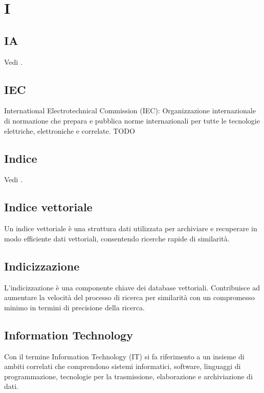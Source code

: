 \section{I}

\vspace{2em}
\subsection*{IA}
\par Vedi .

\vspace{2em}
\subsection*{IEC}
International Electrotechnical Commission (IEC): Organizzazione internazionale di normazione che prepara e pubblica norme internazionali per tutte le tecnologie elettriche, elettroniche e correlate.
TODO

\vspace{2em}
\subsection*{Indice}
\par Vedi .

\vspace{2em}
\subsection*{Indice vettoriale}
\par Un indice vettoriale è una struttura dati utilizzata per archiviare e recuperare in modo efficiente dati vettoriali, consentendo ricerche rapide di similarità.

\vspace{2em}
\subsection*{Indicizzazione}
L'indicizzazione è una componente chiave dei database vettoriali. Contribuisce ad aumentare la velocità del processo di ricerca per similarità con un compromesso minimo in termini di precisione della ricerca.

\vspace{2em}
\subsection*{Information Technology}
\par Con il termine Information Technology (IT) si fa riferimento a un insieme di ambiti correlati che comprendono sistemi informatici, software, linguaggi di programmazione, tecnologie per la trasmissione, elaborazione e archiviazione di dati.


